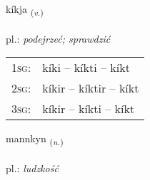 \documentclass[frontgrid, backgrid]{flacards}\usepackage[]{graphicx}\usepackage[]{xcolor}
\begin{document}
\renewcommand{\flhead}{\vskip5pt \fboxsep=0pt {\small\bfseries\footnotesize Sagnorð | czasownik}}
\renewcommand{\fcfoot}{\vskip5pt \fboxsep=0pt \hspace{2pt}{\small\bfseries\footnotesize 3K}}

\renewcommand{\blhead}{\vskip5pt {\small\bfseries\footnotesize Sagnorð | czasownik }}
\renewcommand{\bcfoot}{\vskip5pt \hspace{2pt}{\small\bfseries\footnotesize 3K}}


{kíkja \small{\textsubscript{(\textit{v.})}} \\[1ex] %
\textphonetic{[cʰiːca]} \\
pl.: \emph{podejrzeć; sprawdzić} \\  [2ex]
\renewcommand*{\arraystretch}{0.8}
\begin{tabular}{p{1cm}l}
\textsc{1sg}: & kíki -- kíkti -- kíkt \\ 
\textsc{2sg}: & kíkir -- kíktir -- kíkt \\ 
\textsc{3sg}: & kíkir -- kíkti -- kíkt \\ 
\end{tabular}
}

\renewcommand{\flhead}{\vskip5pt \fboxsep=0pt {\small\bfseries\footnotesize Nafnorð | rzeczownik}}
\renewcommand{\fcfoot}{\vskip5pt \fboxsep=0pt \hspace{2pt}{\small\bfseries\footnotesize 3K}}

\renewcommand{\blhead}{\vskip5pt {\small\bfseries\footnotesize Nafnorð | rzeczownik }}
\renewcommand{\bcfoot}{\vskip5pt \hspace{2pt}{\small\bfseries\footnotesize 3K}}


{mannkyn \small{\textsubscript{(\textit{n.})}} \\[1ex] %
\textphonetic{[maɲcʰɪn]} \\
pl.: \emph{ludzkość} \\  [2ex]
\renewcommand*{\arraystretch}{0.8}
}
\end{document}
